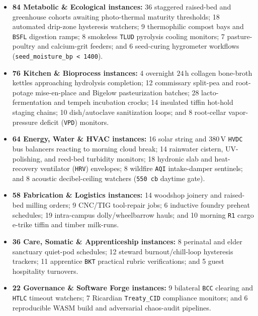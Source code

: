 \begin{itemize}
    \item \textbf{84 Metabolic \& Ecological instances:} 36 staggered raised-bed and greenhouse cohorts
        awaiting photo-thermal maturity thresholds; 18 automated drip-zone hysteresis watchers; 9
        thermophilic compost bays and \texttt{BSFL} digestion ramps; 8 smokeless \texttt{TLUD} pyrolysis
        cooling monitors; 7 pasture-poultry and calcium-grit feeders; and 6 seed-curing hygrometer
        workflows (\texttt{seed\_moisture\_bp < 1400}).
    \item \textbf{76 Kitchen \& Bioprocess instances:} 4 overnight $24\,\mathrm{h}$ collagen bone-broth
        kettles approaching hydrolysis completion; 12 commissary split-pea and root-potage mise-en-place
        and Bigelow pasteurization batches; 28 lacto-fermentation and tempeh incubation crocks; 14
        insulated tiffin hot-hold staging chains; 10 dish/autoclave sanitization loops; and 8 root-cellar
        vapor-pressure deficit (\texttt{VPD}) monitors.
    \item \textbf{64 Energy, Water \& HVAC instances:} 16 solar string and $380\,\mathrm{V}$ \texttt{HVDC}
        bus balancers reacting to morning cloud break; 14 rainwater cistern, UV-polishing, and reed-bed
        turbidity monitors; 18 hydronic slab and heat-recovery ventilator (\texttt{HRV}) envelopes; 8
        wildfire \texttt{AQI} intake-damper sentinels; and 8 acoustic decibel-ceiling watchers
        (\texttt{550 cb} daytime gate).
    \item \textbf{58 Fabrication \& Logistics instances:} 14 woodshop joinery and raised-bed milling
        orders; 9 CNC/TIG tool-repair jobs; 6 inductive foundry preheat schedules; 19 intra-campus
        dolly/wheelbarrow hauls; and 10 morning \texttt{R1} cargo e-trike tiffin and timber milk-runs.
    \item \textbf{36 Care, Somatic \& Apprenticeship instances:} 8 perinatal and elder sanctuary quiet-pod
        schedules; 12 steward burnout/chill-loop hysteresis trackers; 11 apprentice \texttt{BKT} practical
        rubric verifications; and 5 guest hospitality turnovers.
    \item \textbf{22 Governance \& Software Forge instances:} 9 bilateral \texttt{BCC} clearing and
        \texttt{HTLC} timeout watchers; 7 Ricardian \texttt{Treaty\_CID} compliance monitors; and 6
        reproducible WASM build and adversarial chaos-audit pipelines.
\end{itemize}

